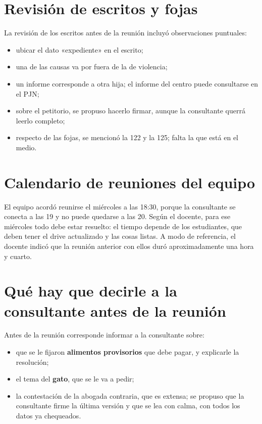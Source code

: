 \documentclass[12pt,oneside]{book}
\begin{document}
\section{Revisión de escritos y fojas}

La revisión de los escritos antes de la reunión incluyó observaciones puntuales:

\begin{itemize}
    \item ubicar el dato «expediente» en el escrito;
    \item una de las causas va por fuera de la de violencia;
    \item un informe corresponde a otra hija; el informe del centro puede consultarse en el PJN;
    \item sobre el petitorio, se propuso hacerlo firmar, aunque la consultante querrá leerlo completo;
    \item respecto de las fojas, se mencionó la 122 y la 125; falta la que está en el medio.
\end{itemize}


\section{Calendario de reuniones del equipo}

El equipo acordó reunirse el miércoles a las 18:30, porque la consultante se conecta a las 19 y no puede quedarse a las 20. Según el docente, para ese miércoles todo debe estar resuelto: el tiempo depende de los estudiantes, que deben tener el drive actualizado y las cosas listas. A modo de referencia, el docente indicó que la reunión anterior con ellos duró aproximadamente una hora y cuarto.

\section{Qué hay que decirle a la consultante antes de la reunión}

Antes de la reunión corresponde informar a la consultante sobre:

\begin{itemize}
    \item que se le fijaron \textbf{alimentos provisorios} que debe pagar, y explicarle la resolución;
    \item el tema del \textbf{gato}, que se le va a pedir;
    \item la contestación de la abogada contraria, que es extensa; se propuso que la consultante firme la última versión y que se lea con calma, con todos los datos ya chequeados.
\end{itemize}
\end{document}
